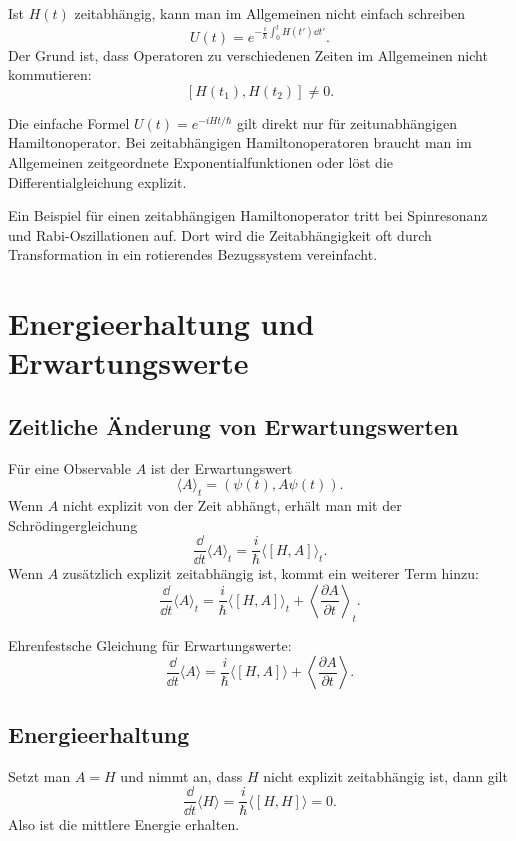Ist $H(t)$ zeitabhängig, kann man im Allgemeinen nicht einfach schreiben
\[
    U(t)=e^{-\frac{i}{\hbar}\int_0^t H(t')\dd t'}.
\]
Der Grund ist, dass Operatoren zu verschiedenen Zeiten im Allgemeinen nicht kommutieren:
\[
    [H(t_1),H(t_2)]\neq 0.
\]

\begin{notebox}
Die einfache Formel $U(t)=e^{-iHt/\hbar}$ gilt direkt nur für zeitunabhängigen Hamiltonoperator. Bei zeitabhängigen Hamiltonoperatoren braucht man im Allgemeinen zeitgeordnete Exponentialfunktionen oder löst die Differentialgleichung explizit.
\end{notebox}

Ein Beispiel für einen zeitabhängigen Hamiltonoperator tritt bei Spinresonanz und Rabi-Oszillationen auf. Dort wird die Zeitabhängigkeit oft durch Transformation in ein rotierendes Bezugssystem vereinfacht.

\section{Energieerhaltung und Erwartungswerte}

\subsection{Zeitliche Änderung von Erwartungswerten}

Für eine Observable $A$ ist der Erwartungswert
\[
    \langle A\rangle_t=(\psi(t),A\psi(t)).
\]
Wenn $A$ nicht explizit von der Zeit abhängt, erhält man mit der Schrödingergleichung
\[
    \frac{\dd}{\dd t}\langle A\rangle_t
    =\frac{i}{\hbar}\langle [H,A]\rangle_t.
\]
Wenn $A$ zusätzlich explizit zeitabhängig ist, kommt ein weiterer Term hinzu:
\[
    \frac{\dd}{\dd t}\langle A\rangle_t
    =\frac{i}{\hbar}\langle [H,A]\rangle_t
     +\left\langle\frac{\partial A}{\partial t}\right\rangle_t.
\]

\begin{formulabox}
Ehrenfestsche Gleichung für Erwartungswerte:
\[
    \frac{\dd}{\dd t}\langle A\rangle
    =\frac{i}{\hbar}\langle[H,A]\rangle
    +\left\langle\frac{\partial A}{\partial t}\right\rangle.
\]
\end{formulabox}

\subsection{Energieerhaltung}

Setzt man $A=H$ und nimmt an, dass $H$ nicht explizit zeitabhängig ist, dann gilt
\[
    \frac{\dd}{\dd t}\langle H\rangle
    =\frac{i}{\hbar}\langle[H,H]\rangle=0.
\]
Also ist die mittlere Energie erhalten.

